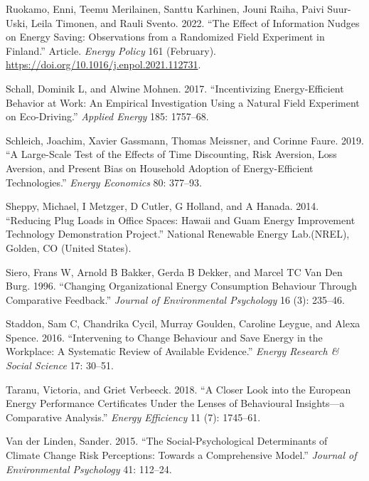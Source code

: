 \documentclass[
  12pt,
  captions=heading]{scrreport}
\newlength{\cslhangindent}
\newlength{\cslentryspacingunit} %
\newenvironment{CSLReferences}[2] %
 {%
  \setlength{\parindent}{0pt}
  \ifodd #1
  \let\oldpar\par
  \def\par{\hangindent=\cslhangindent\oldpar}
  \fi
  \setlength{\parskip}{#2\cslentryspacingunit}
 }%
 {}
\begin{document}
\begin{CSLReferences}{1}{0}
\leavevmode{}%
Ruokamo, Enni, Teemu Merilainen, Santtu Karhinen, Jouni Raiha, Paivi
Suur-Uski, Leila Timonen, and Rauli Svento. 2022. {``The Effect of
Information Nudges on Energy Saving: Observations from a Randomized
Field Experiment in Finland.''} Article. \emph{Energy Policy} 161
(February). \url{https://doi.org/10.1016/j.enpol.2021.112731}.

\leavevmode{}%
Schall, Dominik L, and Alwine Mohnen. 2017. {``Incentivizing
Energy-Efficient Behavior at Work: An Empirical Investigation Using a
Natural Field Experiment on Eco-Driving.''} \emph{Applied Energy} 185:
1757--68.

\leavevmode{}%
Schleich, Joachim, Xavier Gassmann, Thomas Meissner, and Corinne Faure.
2019. {``A Large-Scale Test of the Effects of Time Discounting, Risk
Aversion, Loss Aversion, and Present Bias on Household Adoption of
Energy-Efficient Technologies.''} \emph{Energy Economics} 80: 377--93.

\leavevmode{}%
Sheppy, Michael, I Metzger, D Cutler, G Holland, and A Hanada. 2014.
{``Reducing Plug Loads in Office Spaces: Hawaii and Guam Energy
Improvement Technology Demonstration Project.''} National Renewable
Energy Lab.(NREL), Golden, CO (United States).

\leavevmode{}%
Siero, Frans W, Arnold B Bakker, Gerda B Dekker, and Marcel TC Van Den
Burg. 1996. {``Changing Organizational Energy Consumption Behaviour
Through Comparative Feedback.''} \emph{Journal of Environmental
Psychology} 16 (3): 235--46.

\leavevmode{}%
Staddon, Sam C, Chandrika Cycil, Murray Goulden, Caroline Leygue, and
Alexa Spence. 2016. {``Intervening to Change Behaviour and Save Energy
in the Workplace: A Systematic Review of Available Evidence.''}
\emph{Energy Research \& Social Science} 17: 30--51.

\leavevmode{}%
Taranu, Victoria, and Griet Verbeeck. 2018. {``A Closer Look into the
European Energy Performance Certificates Under the Lenses of Behavioural
Insights---a Comparative Analysis.''} \emph{Energy Efficiency} 11 (7):
1745--61.

\leavevmode{}%
Van der Linden, Sander. 2015. {``The Social-Psychological Determinants
of Climate Change Risk Perceptions: Towards a Comprehensive Model.''}
\emph{Journal of Environmental Psychology} 41: 112--24.


\end{CSLReferences}
\end{document}
